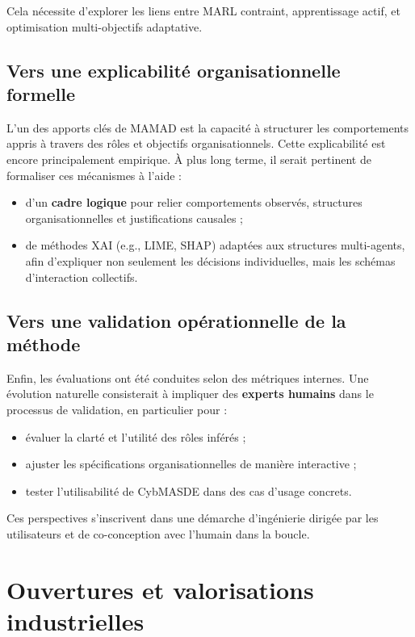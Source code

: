 Cela nécessite d’explorer les liens entre MARL contraint, apprentissage actif, et optimisation multi-objectifs adaptative.

\subsection*{Vers une explicabilité organisationnelle formelle}

L’un des apports clés de MAMAD est la capacité à structurer les comportements appris à travers des rôles et objectifs organisationnels. Cette explicabilité est encore principalement empirique. À plus long terme, il serait pertinent de formaliser ces mécanismes à l’aide :
\begin{itemize}
    \item d’un \textbf{cadre logique} pour relier comportements observés, structures organisationnelles et justifications causales ;
    \item de méthodes XAI (e.g., LIME, SHAP) adaptées aux structures multi-agents, afin d’expliquer non seulement les décisions individuelles, mais les schémas d’interaction collectifs.
\end{itemize}

\subsection*{Vers une validation opérationnelle de la méthode}

Enfin, les évaluations ont été conduites selon des métriques internes. Une évolution naturelle consisterait à impliquer des \textbf{experts humains} dans le processus de validation, en particulier pour :
\begin{itemize}
    \item évaluer la clarté et l’utilité des rôles inférés ;
    \item ajuster les spécifications organisationnelles de manière interactive ;
    \item tester l’utilisabilité de CybMASDE dans des cas d’usage concrets.
\end{itemize}

Ces perspectives s’inscrivent dans une démarche d’ingénierie dirigée par les utilisateurs et de co-conception avec l’humain dans la boucle.

\section{Ouvertures et valorisations industrielles}
\label{sec:perspectives_industrielles}

